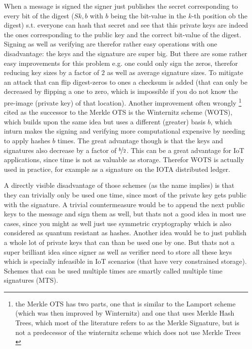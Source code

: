 \documentclass[conference]{IEEEtran}
\begin{document}
When a message is signed the signer just publishes the secret corresponding to every bit of the digest ($S{k,b}$ with $b$ being the bit-value in the $k$-th position ob the digest) s.t. everyone can hash that secret and see that this private keys are indeed the ones corresponding to the public key and the correct bit-value of the digest.
Signing as well as verifying are therefor rather easy operations with one disadvantage: the keys and the signature are super big.
But there are some rather easy improvements for this problem e.g. one could only sign the zeros, therefor reducing key sizes by a factor of $2$ as well as average signature sizes. To mitigate an attack that can flip digest-zeros to ones a checksum is added (that can only be decreased by flipping a one to zero, which is impossible if you do not know the pre-image (private key) of that location).
Another improvement often wrongly
\footnote{the Merkle OTS has two parts, one that is similar to the Lamport scheme (which was then improved by Winternitz) and one that uses Merkle Hash Trees, which most of the literature refers to as the Merkle Signature, but is not a predecessor of the winternitz scheme which does not use Merkle Trees \cite{Merkle_ots}} 
cited as the successor to the Merkle OTS is the Winternitz scheme (WOTS), which builds upon the same idea but uses a different (greater) basis $b$, which inturn makes the signing and verifying more computational expensive by needing to apply hashes $b$ times. The great advantage though is that the keys and signatures also decrease by a factor of $\nicefrac{b}{2}$.
This can be a great advantage for IoT applications, since time is not as valuable as storage. Therefor WOTS is actually used in practice, for example as a signature on the IOTA distributed ledger. \cite{iota_wots}

A directly visible disadvantage of those schemes (as the name implies) is that they can trivially only be used one time, since most of the private key gets public with the signature. 
A trivial countermeasure would be to append the next public keys to the message and sign them as well, but thats not a good idea in most use cases, since you might as well just use symmetric cryptography which is also considered as quantum resistant as hashes.
Another idea would be to just publish a whole lot of private keys that can than be used one by one. But thats not a super brilliant idea since signer as well as verifier need to store all these keys which is specially infeasible in IoT scenarios (that have very constrained storage).
Schemes that can be used multiple times are smartly called multiple time signatures (MTS).
\end{document}
